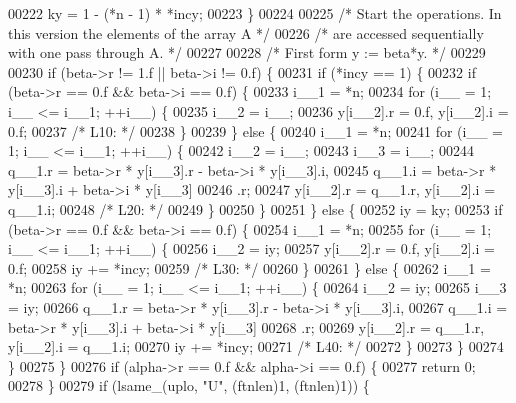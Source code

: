 \begin{DoxyCode}
00222     ky = 1 - (*n - 1) * *incy;
00223     \}
00224 
00225 \textcolor{comment}{/*     Start the operations. In this version the elements of the array A */}
00226 \textcolor{comment}{/*     are accessed sequentially with one pass through A. */}
00227 
00228 \textcolor{comment}{/*     First form  y := beta*y. */}
00229 
00230     \textcolor{keywordflow}{if} (beta->r != 1.f || beta->i != 0.f) \{
00231     \textcolor{keywordflow}{if} (*incy == 1) \{
00232         \textcolor{keywordflow}{if} (beta->r == 0.f && beta->i == 0.f) \{
00233         i\_\_1 = *n;
00234         \textcolor{keywordflow}{for} (i\_\_ = 1; i\_\_ <= i\_\_1; ++i\_\_) \{
00235             i\_\_2 = i\_\_;
00236             y[i\_\_2].r = 0.f, y[i\_\_2].i = 0.f;
00237 \textcolor{comment}{/* L10: */}
00238         \}
00239         \} \textcolor{keywordflow}{else} \{
00240         i\_\_1 = *n;
00241         \textcolor{keywordflow}{for} (i\_\_ = 1; i\_\_ <= i\_\_1; ++i\_\_) \{
00242             i\_\_2 = i\_\_;
00243             i\_\_3 = i\_\_;
00244             q\_\_1.r = beta->r * y[i\_\_3].r - beta->i * y[i\_\_3].i, 
00245                 q\_\_1.i = beta->r * y[i\_\_3].i + beta->i * y[i\_\_3]
00246                 .r;
00247             y[i\_\_2].r = q\_\_1.r, y[i\_\_2].i = q\_\_1.i;
00248 \textcolor{comment}{/* L20: */}
00249         \}
00250         \}
00251     \} \textcolor{keywordflow}{else} \{
00252         iy = ky;
00253         \textcolor{keywordflow}{if} (beta->r == 0.f && beta->i == 0.f) \{
00254         i\_\_1 = *n;
00255         \textcolor{keywordflow}{for} (i\_\_ = 1; i\_\_ <= i\_\_1; ++i\_\_) \{
00256             i\_\_2 = iy;
00257             y[i\_\_2].r = 0.f, y[i\_\_2].i = 0.f;
00258             iy += *incy;
00259 \textcolor{comment}{/* L30: */}
00260         \}
00261         \} \textcolor{keywordflow}{else} \{
00262         i\_\_1 = *n;
00263         \textcolor{keywordflow}{for} (i\_\_ = 1; i\_\_ <= i\_\_1; ++i\_\_) \{
00264             i\_\_2 = iy;
00265             i\_\_3 = iy;
00266             q\_\_1.r = beta->r * y[i\_\_3].r - beta->i * y[i\_\_3].i, 
00267                 q\_\_1.i = beta->r * y[i\_\_3].i + beta->i * y[i\_\_3]
00268                 .r;
00269             y[i\_\_2].r = q\_\_1.r, y[i\_\_2].i = q\_\_1.i;
00270             iy += *incy;
00271 \textcolor{comment}{/* L40: */}
00272         \}
00273         \}
00274     \}
00275     \}
00276     \textcolor{keywordflow}{if} (alpha->r == 0.f && alpha->i == 0.f) \{
00277     \textcolor{keywordflow}{return} 0;
00278     \}
00279     \textcolor{keywordflow}{if} (lsame\_(uplo, \textcolor{stringliteral}{"U"}, (ftnlen)1, (ftnlen)1)) \{

\end{DoxyCode}
